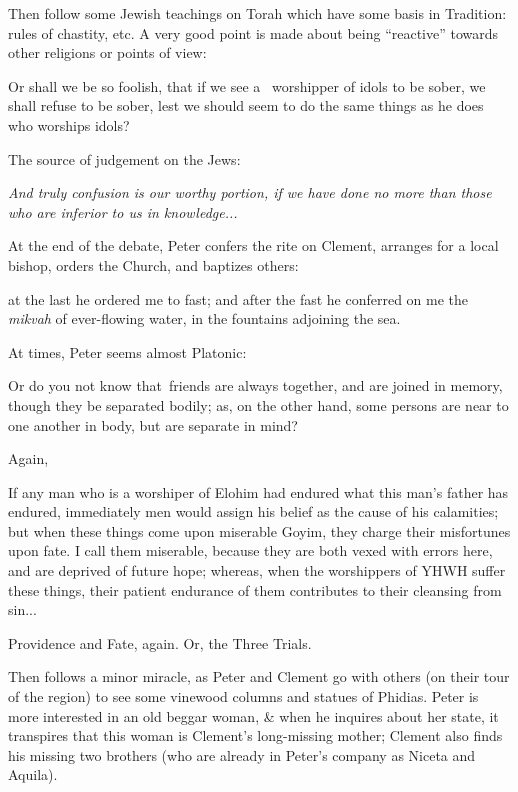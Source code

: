 Then follow some Jewish teachings on Torah which have some basis in Tradition: rules of chastity, etc. A very good point is made about being ``reactive'' towards other religions or points of view:

\begin{quotex}
Or shall we be so foolish, that if we see a~ worshipper of idols to be sober, we shall refuse to be sober, lest we should seem to do the same things as he does who worships idols?
\end{quotex}


The source of judgement on the Jews:

\begin{quotex}
\emph{And truly confusion is our worthy portion, if we have done no more than those who are inferior to us in knowledge... }
\end{quotex}


At the end of the debate, Peter confers the rite on Clement, arranges for a local bishop, orders the Church, and baptizes others:

\begin{quotex}
at the last he ordered me to fast; and after the fast he conferred on me the \emph{mikvah} of ever-flowing water, in the fountains adjoining the sea.
\end{quotex}


At times, Peter seems almost Platonic:

Or do you not know that~friends are always together, and are joined in memory, though they be separated bodily; as, on the other hand, some persons are near to one another in body, but are separate in mind?

Again,

\begin{quotex}
If any man who is a worshiper of Elohim had endured what this man's father has endured, immediately men would assign his belief as the cause of his calamities; but when these things come upon miserable Goyim, they charge their misfortunes upon fate. I call them miserable, because they are both vexed with errors here, and are deprived of future hope; whereas, when the worshippers of YHWH suffer these things, their patient endurance of them contributes to their cleansing from sin... \end{quotex}


Providence and Fate, again. Or, the Three Trials.

Then follows a minor miracle, as Peter and Clement go with others (on their tour of the region) to see some vinewood columns and statues of Phidias. Peter is more interested in an old beggar woman, \& when he inquires about her state, it transpires that this woman is Clement's long-missing mother; Clement also finds his missing two brothers (who are already in Peter's company as Niceta and Aquila).

